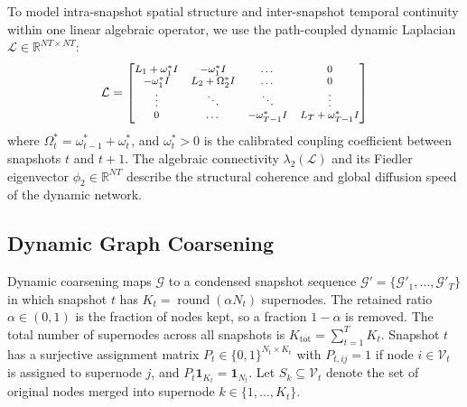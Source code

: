 \documentclass[sigconf]{acmart}
\begin{document}
To model intra-snapshot spatial structure and inter-snapshot temporal continuity within one linear algebraic operator, we use the path-coupled dynamic Laplacian $\mathcal{L} \in \mathbb{R}^{NT \times NT}$:
\begin{equation}
\label{eq:dynamic_laplacian}
\footnotesize
\mathcal{L} = 
\begin{bmatrix}
L_1 + \omega_1^* I & -\omega_1^* I & \dots & 0 \\
-\omega_1^* I & L_2 + \Omega_2^* I & \dots & 0 \\
\vdots & \ddots & \ddots & \vdots \\
0 & \dots & -\omega_{T-1}^* I & L_T + \omega_{T-1}^* I
\end{bmatrix}
\end{equation}
where $\Omega_t^* = \omega_{t-1}^* + \omega_t^*$, and $\omega_t^* > 0$ is the calibrated coupling coefficient between snapshots $t$ and $t+1$. The algebraic connectivity $\lambda_2(\mathcal{L})$ and its Fiedler eigenvector $\phi_2 \in \mathbb{R}^{NT}$ describe the structural coherence and global diffusion speed of the dynamic network.

\subsection{Dynamic Graph Coarsening}
Dynamic coarsening maps $\mathcal{G}$ to a condensed snapshot sequence $\mathcal{G}' = \{\mathcal{G}'_1, \dots, \mathcal{G}'_T\}$ in which snapshot $t$ has $K_t = \operatorname{round}(\alpha N_t)$ supernodes. The retained ratio $\alpha \in (0, 1)$ is the fraction of nodes kept, so a fraction $1 - \alpha$ is removed. The total number of supernodes across all snapshots is $K_{\text{tot}} = \sum_{t=1}^T K_t$. Snapshot $t$ has a surjective assignment matrix $P_t \in \{0, 1\}^{N_t \times K_t}$ with $P_{t, ij} = 1$ if node $i \in \mathcal{V}_t$ is assigned to supernode $j$, and $P_t \mathbf{1}_{K_t} = \mathbf{1}_{N_t}$. Let $S_k \subseteq \mathcal{V}_t$ denote the set of original nodes merged into supernode $k \in \{1, \dots, K_t\}$.
\end{document}

